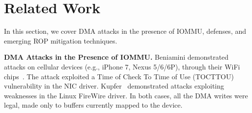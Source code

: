 \section{Related Work}
In this section, we cover DMA attacks in the presence of IOMMU, defenses, and emerging ROP mitigation techniques.

\smallskip
\noindent\textbf{DMA Attacks in the Presence of IOMMU.}
Beniamini demonstrated attacks on cellular devices (e.g., iPhone 7, Nexus 5/6/6P), through their WiFi chips~\cite{Ben17a, Ben17b}. 
The attack exploited a Time of Check To Time of Use (TOCTTOU) vulnerability in the NIC driver. Kupfer~\cite{kupfer2018iommu} demonstrated \simple attacks exploiting weaknesses in the Linux FireWire driver. In both cases, all the DMA writes were legal, made only to buffers currently mapped to the device.



